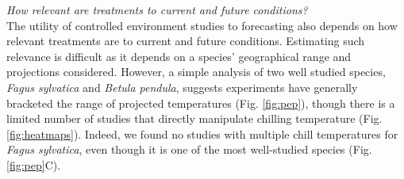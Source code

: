 \documentclass[11pt,letter]{article}
\begin{document}

\emph{How relevant are treatments to current and future conditions?}\\
The utility of controlled environment studies to forecasting also depends on how relevant treatments are to current and future conditions. Estimating such relevance is difficult as it depends on a species' geographical range and projections considered. However, a simple analysis of two well studied species, \emph{Fagus sylvatica} and \emph{Betula pendula}, suggests experiments have generally bracketed the range of projected temperatures (Fig. \ref{fig:pep}), though there is a limited number of studies that directly manipulate chilling temperature (Fig. \ref{fig:heatmaps}). Indeed, we found no studies with multiple chill temperatures for \emph{Fagus sylvatica}, even though it is one of the most well-studied species (Fig. \ref{fig:pep}C). \\ %
\end{document}
